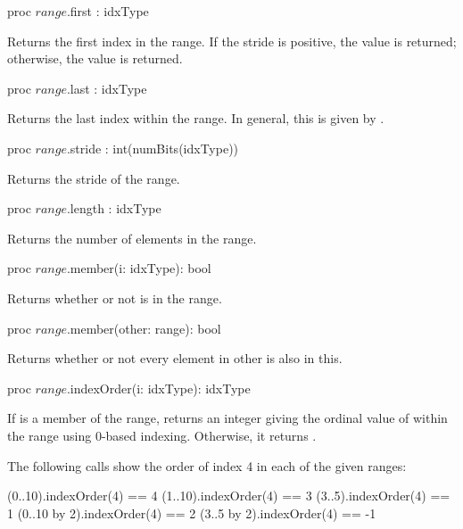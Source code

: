 \begin{protohead}
proc $range$.first : idxType
\end{protohead}
\begin{protobody}
Returns the first index in the range.  If the stride is positive, the 
 value is returned; otherwise, the  value is returned.
\end{protobody}

\begin{protohead}
proc $range$.last : idxType
\end{protohead}
\begin{protobody}
Returns the last index within the range.  In general, this is given
by .
\end{protobody}

\begin{protohead}
proc $range$.stride : int(numBits(idxType))
\end{protohead}
\begin{protobody}
Returns the stride of the range.
\end{protobody}

\begin{protohead}
proc $range$.length : idxType
\end{protohead}
\begin{protobody}
Returns the number of elements in the range.
\end{protobody}

\begin{protohead}
proc $range$.member(i: idxType): bool
\end{protohead}
\begin{protobody}
Returns whether or not  is in the range.
\end{protobody}

\begin{protohead}
proc $range$.member(other: range): bool
\end{protohead}
\begin{protobody}
Returns whether or not every element in other is also in this.
\end{protobody}

\begin{protohead}
proc $range$.indexOrder(i: idxType): idxType
\end{protohead}
\begin{protobody}
If  is a member of the range, returns an integer giving
the ordinal value of  within the range using 0-based indexing.
Otherwise, it returns .
\end{protobody}

\begin{example}
The following calls show the order of index 4 in each of the given
ranges:
\begin{chapel}
(0..10).indexOrder(4) == 4
(1..10).indexOrder(4) == 3
(3..5).indexOrder(4) == 1
(0..10 by 2).indexOrder(4) == 2
(3..5 by 2).indexOrder(4) == -1
\end{chapel}
\end{example}

